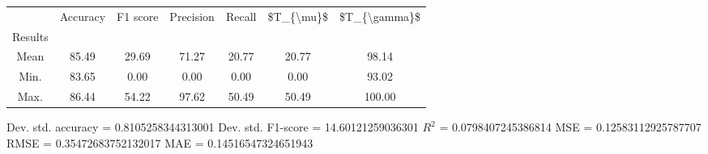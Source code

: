 \begin{tabular}{|c|c|c|c|c|c|c|}
\toprule
{} &  Accuracy &  F1 score &  Precision &  Recall &  \$T\_\{\textbackslash mu\}\$ &  \$T\_\{\textbackslash gamma\}\$ \\
Results &           &           &            &         &            &               \\
\hline
Mean    &     85.49 &     29.69 &      71.27 &   20.77 &      20.77 &         98.14 \\
Min.    &     83.65 &      0.00 &       0.00 &    0.00 &       0.00 &         93.02 \\
Max.    &     86.44 &     54.22 &      97.62 &   50.49 &      50.49 &        100.00 \\
\bottomrule
\end{tabular}

 Dev. std. accuracy = 0.8105258344313001
 Dev. std. F1-score = 14.60121259036301
 $R^2$ = 0.0798407245386814
 MSE = 0.12583112925787707
 RMSE = 0.35472683752132017
 MAE = 0.14516547324651943